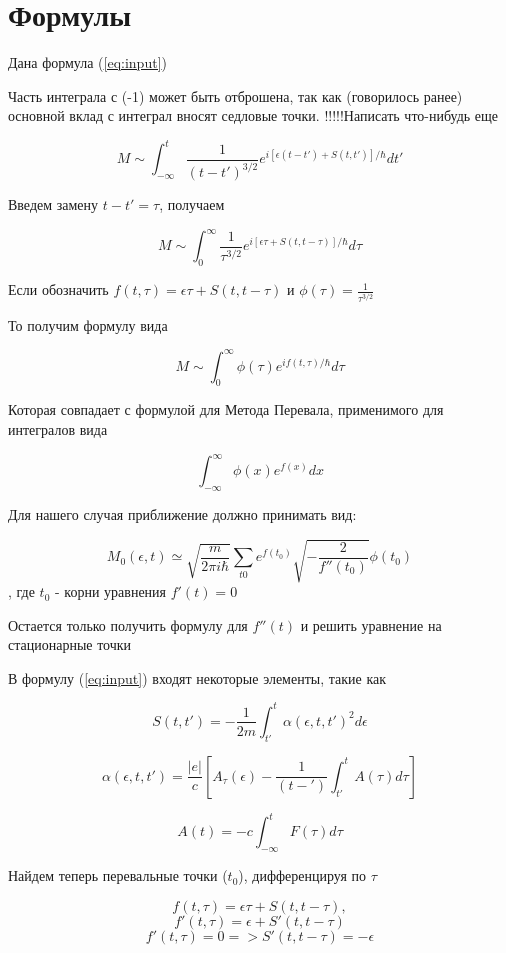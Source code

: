 \documentclass[14pt]{extarticle}
\begin{document}
%



\section{Формулы}
Дана формула (\ref{eq:input})

Часть интеграла с (-1) может быть отброшена, так как (говорилось ранее) основной вклад с интеграл вносят седловые точки. !!!!!Написать что-нибудь еще

$$
M \sim \int_{-\infty}^{t} \frac{1}{(t-t')^{3/2}} e^{i[\epsilon (t - t') + S(t, t')]/\hbar} dt'
$$

Введем замену $t - t' = \tau$, получаем

$$
M \sim \int_{0}^{\infty}\frac{1}{{\tau}^{3/2}}e^{i [\epsilon \tau + S(t, t-\tau)]/\hbar} d\tau
$$

Если обозначить
$
f(t, \tau) = \epsilon \tau + S(t, t-\tau) 
$ и
$
\phi(\tau) = \frac{1}{{\tau}^{3/2}} 
$

То получим формулу вида

$$
M \sim \int_{0}^{\infty} \phi(\tau) e^{i f(t, \tau)/\hbar} d\tau
$$

Которая совпадает с формулой для Метода Перевала, применимого для интегралов вида

$$
\int_{-\infty}^{\infty} \phi(x) e^{f(x)}dx
$$

Для нашего случая приближение должно принимать вид:

$$
M_0(\epsilon, t) \simeq \sqrt{\frac{m}{2\pi i \hbar}}\sum_{t0}e^{f(t_0)} \sqrt{-\frac{2}{f''(t_0)}} \phi(t_0)
$$, где $t_0$ - корни уравнения $f'(t) = 0$

Остается только получить формулу для $f''(t)$ и решить уравнение на стационарные точки 

В формулу (\ref{eq:input}) входят некоторые элементы, такие как

$$
S(t, t') = -\frac{1}{2m}\int_{t'}^{t} \alpha(\epsilon, t, t')^2 d\epsilon
$$

$$
\alpha(\epsilon, t, t') = \frac{|e|}{c} [A_{\tau}(\epsilon) - \frac{1}{(t-')}\int_{t'}^{t}A(\tau) d\tau]
$$

$$
A(t) = -c\int_{-\infty}^{t} F(\tau) d\tau
$$

Найдем теперь перевальные точки ($t_0$), дифференцируя по $\tau$

$$
f(t, \tau) = \epsilon \tau + S(t, t-\tau),
$$
$$
f'(t, \tau) = \epsilon + S'(t, t-\tau)
$$
\begin{equation}\label{eq:points}
	f'(t, \tau)=0 => S'(t, t-\tau) = -\epsilon
\end{equation}
\end{document}
